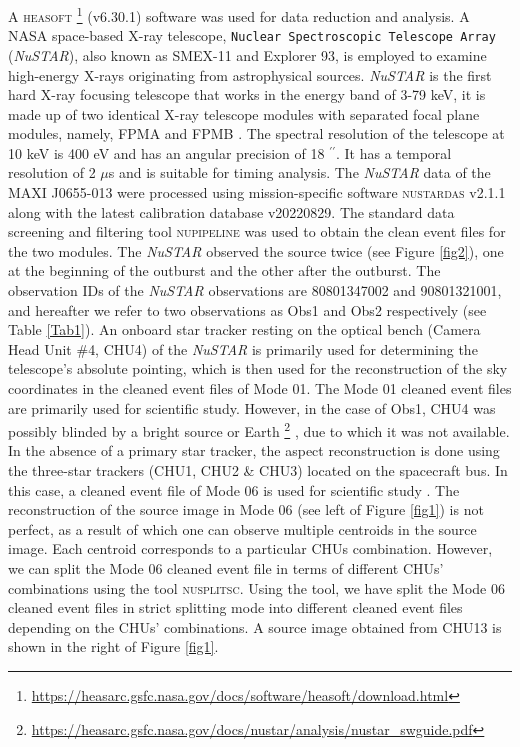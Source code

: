 \documentclass[12pt,a4paper,fleqn,usenatbib]{mnras}
\begin{document}
A \textsc{heasoft} \footnote{\url{https://heasarc.gsfc.nasa.gov/docs/software/heasoft/download.html}} (v6.30.1) software was used for data reduction and analysis. A NASA space-based X-ray telescope, \texttt{Nuclear Spectroscopic Telescope Array} (\emph{NuSTAR}), also known as SMEX-11 and Explorer 93, is employed to examine high-energy X-rays originating from astrophysical sources. \emph{NuSTAR} is the first hard X-ray focusing telescope that works in the energy band of 3-79 keV, it is made up of two identical X-ray telescope modules with separated focal plane modules, namely, FPMA and FPMB \citep{Harrison_2013}. The spectral resolution of the telescope at 10 keV is 400 eV and has an angular precision of 18 $^{\prime\prime}$. It has a temporal resolution of 2 $\mu$s and is suitable for timing analysis. The \emph{NuSTAR} data of the MAXI J0655-013 were processed using mission-specific software \textsc{nustardas} v2.1.1 along with the latest calibration database v20220829. The standard data screening and filtering tool \textsc{nupipeline} was used to obtain the clean event files for the two modules. 
The \emph{NuSTAR} observed the source twice (see Figure \ref{fig2}), one at the beginning of the outburst and the other after the outburst. The observation IDs of the \emph{NuSTAR} observations are 80801347002 and 90801321001, and hereafter we refer to two observations as Obs1 and Obs2 respectively (see Table \ref{Tab1}). An onboard star tracker resting on the optical bench (Camera Head Unit $\#$4, CHU4) of the \emph{NuSTAR} is primarily used for determining the telescope's absolute pointing, which is then used for the reconstruction of the sky coordinates in the cleaned event files of Mode 01. The Mode 01 cleaned event files are primarily used for scientific study. However, in the case of Obs1, CHU4 was possibly blinded by a bright source or Earth \footnote{\url{https://heasarc.gsfc.nasa.gov/docs/nustar/analysis/nustar_swguide.pdf}} \citep{2022ApJ...927..190P}, due to which it was not available. In the absence of a primary star tracker, the aspect reconstruction is done using the three-star trackers (CHU1, CHU2 \& CHU3) located on the spacecraft bus. In this case, a cleaned event file of Mode 06 is used for scientific study \citep{2022ApJ...927..190P}. The reconstruction of the source image in Mode 06 (see left of Figure \ref{fig1}) is not perfect, as a result of which one can observe multiple centroids in the source image. Each centroid corresponds to a particular CHUs combination. However, we can split the Mode 06 cleaned event file in terms of different CHUs' combinations using the tool \textsc{nusplitsc}. Using the tool, we have split the Mode 06 cleaned event files in strict splitting mode into different cleaned event files depending on the CHUs' combinations. A source image obtained from CHU13 is shown in the right of Figure \ref{fig1}.
\end{document}
